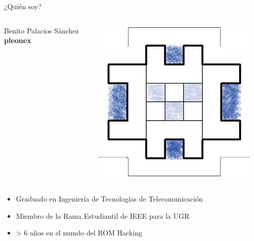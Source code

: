 \begin{frame}{¿Quién soy?}

    \begin{columns}
    \begin{column}{0.75\textwidth}
        \Large
        Benito Palacios Sánchez \\
        \textbf{pleonex}
    \end{column}
    \begin{column}{0.25\textwidth}
        \includegraphics[width=\textwidth]{../pleonex.png}
    \end{column}
    \end{columns}

    \vfill
    \setlength{\leftmargini}{0em}
    \begin{itemize}
        \item Graduado en Ingeniería de Tecnologías de Telecomunicación
        \item Miembro de la Rama Estudiantil de IEEE para la UGR
        \item > 6 años en el mundo del ROM Hacking
    \end{itemize}
\end{frame}

